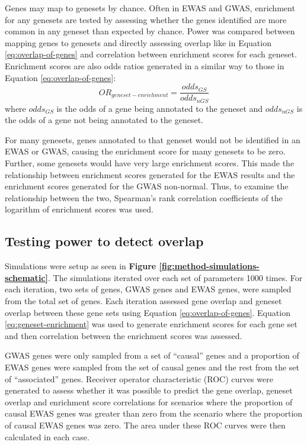 \documentclass[11pt,oneside]{bristolthesis}
\begin{document}
Genes may map to genesets by chance. Often in EWAS and GWAS, enrichment for any genesets are tested by assessing whether the genes identified are more common in any geneset than expected by chance. Power was compared between mapping genes to genesets and directly assessing overlap like in Equation \eqref{eq:overlap-of-genes} and correlation between enrichment scores for each geneset. Enrichment scores are also odds ratios generated in a similar way to those in Equation \eqref{eq:overlap-of-genes}:
\begin{equation}
    OR_{geneset-enrichment} = \frac{odds_{GS}} {odds_{nGS}}
    \label{eq:geneset-enrichment}
\end{equation}
where \(odds_{GS}\) is the odds of a gene being annotated to the geneset and \(odds_{nGS}\) is the odds of a gene not being annotated to the geneset.

For many genesets, genes annotated to that geneset would not be identified in an EWAS or GWAS, causing the enrichment score for many genesets to be zero. Further, some genesets would have very large enrichment scores. This made the relationship between enrichment scores generated for the EWAS results and the enrichment scores generated for the GWAS non-normal. Thus, to examine the relationship between the two, Spearman's rank correlation coefficients of the logarithm of enrichment scores was used.

\hypertarget{testing-power-to-detect-overlap}{%
\subsection{Testing power to detect overlap}\label{testing-power-to-detect-overlap}}

Simulations were setup as seen in \textbf{Figure \ref{fig:method-simulations-schematic}}. The simulations iterated over each set of parameters 1000 times. For each iteration, two sets of genes, GWAS genes and EWAS genes, were sampled from the total set of genes. Each iteration assessed gene overlap and geneset overlap between these gene sets using Equation \eqref{eq:overlap-of-genes}. Equation \eqref{eq:geneset-enrichment} was used to generate enrichment scores for each gene set and then correlation between the enrichment scores was assessed.

GWAS genes were only sampled from a set of ``causal'' genes and a proportion of EWAS genes were sampled from the set of causal genes and the rest from the set of ``associated'' genes. Receiver operator characteristic (ROC) curves were generated to assess whether it was possible to predict the gene overlap, geneset overlap and enrichment score correlations for scenarios where the proportion of causal EWAS genes was greater than zero from the scenario where the proportion of causal EWAS genes was zero. The area under these ROC curves were then calculated in each case.
\end{document}
